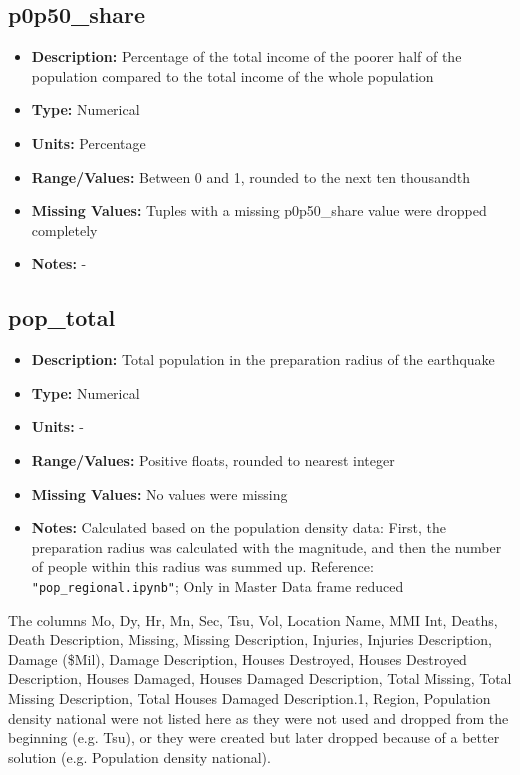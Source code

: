 \documentclass{article}
\begin{document}
\subsection{p0p50\_share}
\begin{itemize}
    \item \textbf{Description:} Percentage of the total income of the poorer half of the population compared to the total income of the whole population
    \item \textbf{Type:} Numerical
    \item \textbf{Units:} Percentage
    \item \textbf{Range/Values:} Between 0 and 1, rounded to the next ten thousandth
    \item \textbf{Missing Values:} Tuples with a missing p0p50\_share value were dropped completely
    \item \textbf{Notes:} -
\end{itemize}

\subsection{pop\_total}
\begin{itemize}
    \item \textbf{Description:} Total population in the preparation radius of the earthquake
    \item \textbf{Type:} Numerical
    \item \textbf{Units:} -
    \item \textbf{Range/Values:} Positive floats, rounded to nearest integer
    \item \textbf{Missing Values:} No values were missing
    \item \textbf{Notes:} Calculated based on the population density data: First, the preparation radius was calculated with the magnitude, and then the number of people within this radius was summed up. Reference: \lstinline{"pop_regional.ipynb"}; 
    Only in Master Data frame reduced
\end{itemize}

The columns Mo, Dy, Hr, Mn, Sec, Tsu, Vol, Location Name, MMI Int, Deaths, Death Description, Missing, Missing Description, Injuries, Injuries Description, Damage (\$Mil), Damage Description, Houses Destroyed, Houses Destroyed Description, Houses Damaged, Houses Damaged Description, Total Missing, Total Missing Description, Total Houses Damaged Description.1, Region, Population density national were not listed here as they were not used and dropped from the beginning (e.g. Tsu), or they were created but later dropped because of a better solution (e.g. Population density national).
\end{document}
